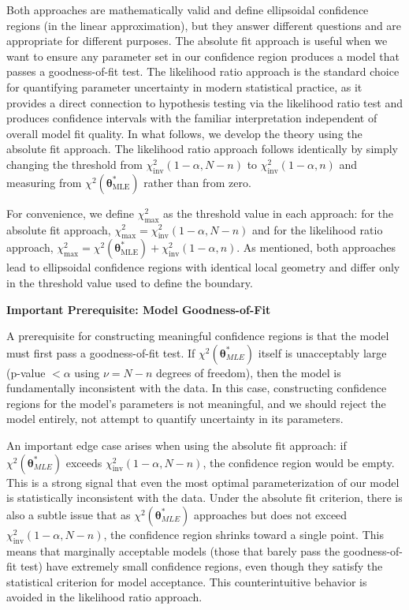 \begin{definitionBox}
Both approaches are mathematically valid and define ellipsoidal confidence regions (in the linear approximation), but they answer different questions and are appropriate for different purposes. The absolute fit approach is useful when we want to ensure any parameter set in our confidence region produces a model that passes a goodness-of-fit test. The likelihood ratio approach is the standard choice for quantifying parameter uncertainty in modern statistical practice, as it provides a direct connection to hypothesis testing via the likelihood ratio test and produces confidence intervals with the familiar interpretation independent of overall model fit quality. In what follows, we develop the theory using the absolute fit approach. The likelihood ratio approach follows identically by simply changing the threshold from $\chi^2_{\text{inv}}(1-\alpha, N-n)$ to $\chi^2_{\text{inv}}(1-\alpha, n)$ and measuring from $\chi^2(\boldsymbol{\theta}^*_{\text{MLE}})$ rather than from zero.
\end{definitionBox}
For convenience, we define $\chi^2_{\text{max}}$ as the threshold value in each approach: for the absolute fit approach, $\chi^2_{\text{max}} = \chi^2_{\text{inv}}(1-\alpha, N-n)$ and for the likelihood ratio approach, $\chi^2_{\text{max}} = \chi^2(\boldsymbol{\theta}^*_{\text{MLE}}) + \chi^2_{\text{inv}}(1-\alpha, n)$. As mentioned, both approaches lead to ellipsoidal confidence regions with identical local geometry and differ only in the threshold value used to define the boundary.

\begin{warningBox}
    \textbf{Important Prerequisite: Model Goodness-of-Fit}
    
    A prerequisite for constructing meaningful confidence regions is that the model must first pass a goodness-of-fit test. If $\chi^2(\boldsymbol{\theta}^*_{MLE})$ itself is unacceptably large (p-value $< \alpha$ using $\nu = N-n$ degrees of freedom), then the model is fundamentally inconsistent with the data. In this case, constructing confidence regions for the model's parameters is not meaningful, and we should reject the model entirely, not attempt to quantify uncertainty in its parameters.
    
    An important edge case arises when using the absolute fit approach: if $\chi^2(\boldsymbol{\theta}^*_{MLE})$ exceeds $\chi^2_{\text{inv}}(1-\alpha, N-n)$, the confidence region would be empty. This is a strong signal that even the most optimal parameterization of our model is statistically inconsistent with the data. Under the absolute fit criterion, there is also a subtle issue that as $\chi^2(\boldsymbol{\theta}^*_{MLE})$ approaches but does not exceed $\chi^2_{\text{inv}}(1-\alpha, N-n)$, the confidence region shrinks toward a single point. This means that marginally acceptable models (those that barely pass the goodness-of-fit test) have extremely small confidence regions, even though they satisfy the statistical criterion for model acceptance. This counterintuitive behavior is avoided in the likelihood ratio approach.
\end{warningBox}

